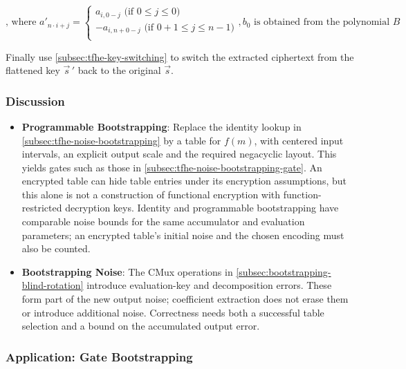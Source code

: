 \begin{enumerate}
\[
    \text{, where } a'_{n \cdot i + j} =   
    \begin{cases}
      a_{i,0 - j} \text{ (if } 0 \leq j \leq 0\text{)}\\
      -a_{i,n + 0 - j} \text{ (if } 0+1 \leq j \leq n-1\text{)}\\
  \end{cases}
, b_0 \text{ is obtained from the polynomial } B
\]


Finally use \autoref{subsec:tfhe-key-switching} to switch the extracted ciphertext from the flattened key $\vec s\,\prime$ back to the original $\vec s$.

\end{enumerate}


\subsubsection{Discussion}
\label{subsec:tfhe-noise-bootstrapping-discussion}

\begin{itemize}
\item \textbf{Programmable Bootstrapping}: Replace the identity lookup in \autoref{subsec:tfhe-noise-bootstrapping} by a table for $f(m)$, with centered input intervals, an explicit output scale and the required negacyclic layout. This yields gates such as those in \autoref{subsec:tfhe-noise-bootstrapping-gate}. An encrypted table can hide table entries under its encryption assumptions, but this alone is not a construction of functional encryption with function-restricted decryption keys. Identity and programmable bootstrapping have comparable noise bounds for the same accumulator and evaluation parameters; an encrypted table's initial noise and the chosen encoding must also be counted.
\item \textbf{Bootstrapping Noise}: The CMux operations in \autoref{subsec:bootstrapping-blind-rotation} introduce evaluation-key and decomposition errors. These form part of the new output noise; coefficient extraction does not erase them or introduce additional noise. Correctness needs both a successful table selection and a bound on the accumulated output error.
\end{itemize}


\subsubsection{Application: Gate Bootstrapping}
\label{subsec:tfhe-noise-bootstrapping-gate}


